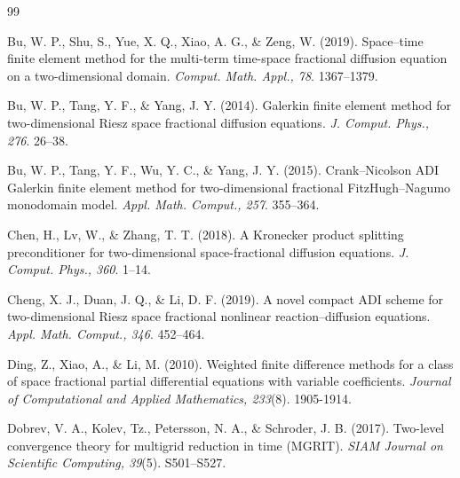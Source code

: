 
\begin{thebibliography}{99}
\thispagestyle{empty}

\begin{LTRbibitems}
\resetlatinfont
Bu, W. P., Shu, S., Yue, X. Q., Xiao, A. G., \& Zeng, W.  
(2019).
Space–time finite element method for the multi-term time-space fractional diffusion equation on a two-dimensional domain.
\textit{Comput. Math. Appl., 78}.
1367–1379.

Bu, W. P., Tang, Y. F., \& Yang, J. Y.
(2014).
Galerkin finite element method for two-dimensional Riesz space fractional diffusion equations.
\textit{J. Comput. Phys., 276}.
26–38.

Bu, W. P., Tang, Y. F., Wu, Y. C., \& Yang, J. Y.
(2015).
Crank–Nicolson ADI Galerkin finite element method for two-dimensional fractional FitzHugh–Nagumo monodomain model.
\textit{Appl. Math. Comput., 257}.
355–364.

Chen, H., Lv, W., \& Zhang, T. T.
(2018).
A Kronecker product splitting preconditioner for two-dimensional space-fractional diffusion equations.
\textit{J. Comput. Phys., 360}.
1–14.

Cheng, X. J., Duan, J. Q., \& Li, D. F.
(2019).
A novel compact ADI scheme for two-dimensional Riesz space fractional nonlinear reaction–diffusion equations.
\textit{Appl. Math. Comput., 346}.
452–464.

Ding, Z., Xiao, A., \& Li, M.
(2010).
Weighted finite difference methods for a class of space fractional partial differential equations with variable coefficients.
\textit{Journal of Computational and Applied Mathematics, 233}(8).
1905-1914.

Dobrev, V. A., Kolev, Tz.,  Petersson, N. A., \& Schroder, J. B. 
(2017).
Two-level convergence theory for multigrid reduction in time (MGRIT).
\textit{SIAM Journal on Scientific Computing, 39}(5).
S501–S527.


\end{LTRbibitems}
\end{thebibliography}
